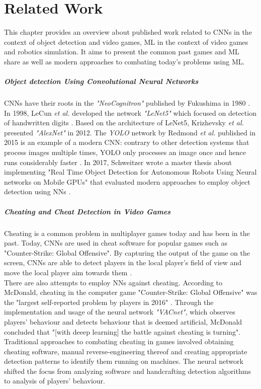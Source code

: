 \chapter{Related Work}

This chapter provides an overview about published work related to \acp{CNN} in the context of object detection and video games, \ac{ML} in the context of video games and robotics simulation. It aims to present the common past games and \ac{ML} share as well as modern approaches to combating today's problems using \ac{ML}.

\paragraph{Object detection Using Convolutional Neural Networks}
\acp{CNN} have their roots in the \emph{"NeoCognitron"} published by Fukushima in 1980 \cite{6313076}. In 1998, LeCun \textit{et al.} developed the network \textit{"LeNet5"} which focused on detection of handwritten digits \cite{Lecun98gradient-basedlearning}. Based on the architecture of LeNet5, Krizhevsky \textit{et al.} presented \emph{"AlexNet"} in 2012. The \emph{\ac{YOLO}} network by Redmond \textit{et al.} published in 2015 is an example of a modern \ac{CNN}: contrary to other detection systems that process images multiple times, \ac{YOLO} only processes an image once and hence runs considerably faster \cite{DBLP:journals/corr/RedmonDGF15}\cite{redmon2016yolo9000}\cite{yolov3}.
In 2017, Schweitzer wrote a master thesis about implementing "Real Time Object Detection for Autonomous Robots Using Neural networks on Mobile GPUs" that evaluated modern approaches to employ object detection using \acp{NN} \cite{Schweitzer2017}.

\paragraph{Cheating and Cheat Detection in Video Games}
Cheating is a common problem in multiplayer games today and has been in the past. Today, \acp{CNN} are used in cheat software for popular games such as "Counter-Strike: Global Offensive". By capturing the output of the game on the screen, \acp{CNN} are able to detect players in the local player's field of view and move the local player aim towards them \cite{Hayha}.\\
There are also attempts to employ \acp{NN} against cheating. According to McDonald, cheating in the computer game "Counter-Strike: Global Offensive" was the "largest self-reported problem by players in 2016" \cite{VACnet}. Through the implementation and usage of the neural network \emph{"VACnet"}, which observes players' behaviour and detects behaviour that is deemed artificial, McDonald concluded that "[with deeep learning] the battle against cheating is turning". Traditional approaches to combating cheating in games involved obtaining cheating software, manual reverse-engineering thereof and creating appropriate detection patterns to identify them running on machines. The neural network shifted the focus from analyzing software and handcrafting detection algorithms to analysis of players' behaviour.

